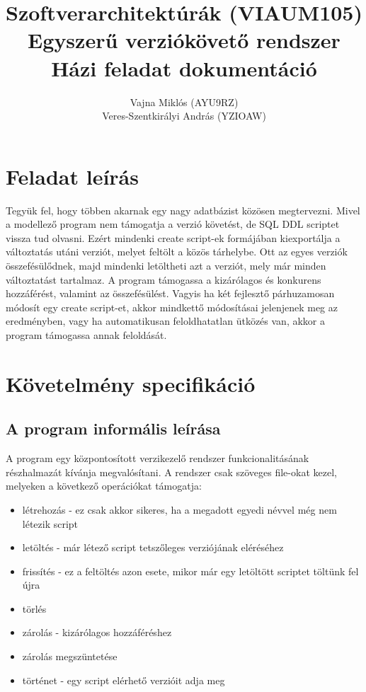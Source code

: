 \documentclass[a4paper,12pt]{article}
\title{Szoftverarchitektúrák (VIAUM105)\\Egyszerű verziókövető rendszer\\Házi feladat dokumentáció}
\author{Vajna Miklós (AYU9RZ)\\Veres-Szentkirályi András (YZIOAW)}
\begin{document}
\maketitle
\thispagestyle{empty}
\lstset{numbers=left, numberstyle=\tiny, basicstyle=\ttfamily, breaklines=true, frame=single, tabsize=2}

\pagebreak
\onehalfspacing
\section{Feladat leírás}

Tegyük fel, hogy többen akarnak egy nagy adatbázist közösen megtervezni. Mivel
a modellező program nem támogatja a verzió követést, de SQL DDL scriptet vissza
tud olvasni. Ezért mindenki create script-ek formájában kiexportálja a
változtatás utáni verziót, melyet feltölt a közös tárhelybe. Ott az egyes
verziók összefésülődnek, majd mindenki letöltheti azt a verziót, mely már
minden változtatást tartalmaz. A program támogassa a kizárólagos és konkurens
hozzáférést, valamint az összefésülést. Vagyis ha két fejlesztő párhuzamosan
módosít egy create script-et, akkor mindkettő módosításai jelenjenek meg az
eredményben, vagy ha automatikusan feloldhatatlan ütközés van, akkor a program
támogassa annak feloldását.

\section{Követelmény specifikáció}
\subsection{A program informális leírása}

A program egy központosított verzikezelő rendszer funkcionalitásának
részhalmazát kívánja megvalósítani. A rendszer csak szöveges file-okat kezel,
melyeken a következő operációkat támogatja:

\begin{itemize}
\item létrehozás - ez csak akkor sikeres, ha a megadott egyedi névvel még nem létezik script
\item letöltés - már létező script tetszőleges verziójának eléréséhez
\item frissítés - ez a feltöltés azon esete, mikor már egy letöltött scriptet töltünk fel újra
\item törlés
\item zárolás - kizárólagos hozzáféréshez
\item zárolás megszüntetése
\item történet - egy script elérhető verzióit adja meg
\end{itemize}
\end{document}
